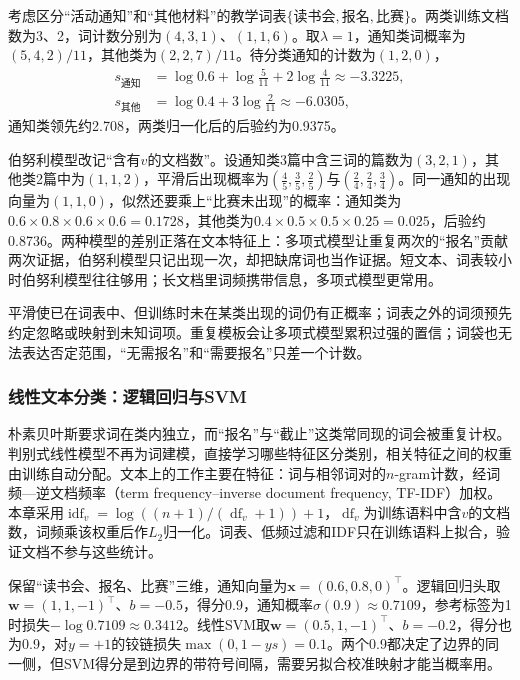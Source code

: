 考虑区分“活动通知”和“其他材料”的教学词表$\{\text{读书会},\text{报名},\text{比赛}\}$。两类训练文档数为3、2，词计数分别为$(4,3,1)$、$(1,1,6)$。取$\lambda=1$，通知类词概率为$(5,4,2)/11$，其他类为$(2,2,7)/11$。待分类通知的计数为$(1,2,0)$，
\[
  \begin{aligned}
    s_{\text{通知}}&=\log0.6+\log\tfrac{5}{11}+2\log\tfrac{4}{11}\approx-3.3225,\\
    s_{\text{其他}}&=\log0.4+3\log\tfrac{2}{11}\approx-6.0305,
  \end{aligned}
\]
通知类领先约2.708，两类归一化后的后验约为0.9375。

伯努利模型改记“含有$v$的文档数”。设通知类3篇中含三词的篇数为$(3,2,1)$，其他类2篇中为$(1,1,2)$，平滑后出现概率为$(\tfrac45,\tfrac35,\tfrac25)$与$(\tfrac24,\tfrac24,\tfrac34)$。同一通知的出现向量为$(1,1,0)$，似然还要乘上“比赛未出现”的概率：通知类为$0.6\times0.8\times0.6\times0.6=0.1728$，其他类为$0.4\times0.5\times0.5\times0.25=0.025$，后验约0.8736。两种模型的差别正落在文本特征上：多项式模型让重复两次的“报名”贡献两次证据，伯努利模型只记出现一次，却把缺席词也当作证据。短文本、词表较小时伯努利模型往往够用；长文档里词频携带信息，多项式模型更常用。

平滑使已在词表中、但训练时未在某类出现的词仍有正概率；词表之外的词须预先约定忽略或映射到未知词项。重复模板会让多项式模型累积过强的置信；词袋也无法表达否定范围，“无需报名”和“需要报名”只差一个计数。

\subsubsection{线性文本分类：逻辑回归与SVM}
\label{sec:nlp-classification-linear}

朴素贝叶斯要求词在类内独立，而“报名”与“截止”这类常同现的词会被重复计权。判别式线性模型不再为词建模，直接学习哪些特征区分类别，相关特征之间的权重由训练自动分配。文本上的工作主要在特征：词与相邻词对的$n$-gram计数，经词频—逆文档频率（term frequency–inverse document frequency, TF-IDF）加权。本章采用$\operatorname{idf}_v=\log((n+1)/(\operatorname{df}_v+1))+1$，$\operatorname{df}_v$为训练语料中含$v$的文档数，词频乘该权重后作$L_2$归一化。词表、低频过滤和IDF只在训练语料上拟合，验证文档不参与这些统计。

保留“读书会、报名、比赛”三维，通知向量为$\bm x=(0.6,0.8,0)^\top$。逻辑回归头取$\bm w=(1,1,-1)^\top$、$b=-0.5$，得分0.9，通知概率$\sigma(0.9)\approx0.7109$，参考标签为1时损失$-\log0.7109\approx0.3412$。线性SVM取$\bm w=(0.5,1,-1)^\top$、$b=-0.2$，得分也为0.9，对$y=+1$的铰链损失$\max(0,1-ys)=0.1$。两个0.9都决定了边界的同一侧，但SVM得分是到边界的带符号间隔，需要另拟合校准映射才能当概率用。

